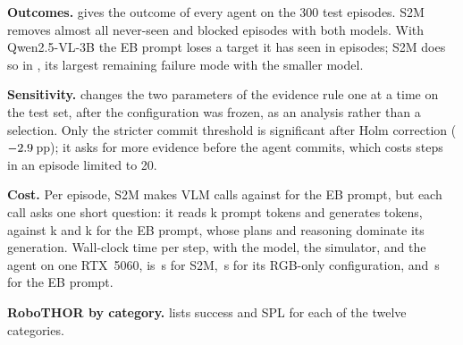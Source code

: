 \documentclass[10pt,twocolumn,letterpaper]{article}
\newcommand{\ours}{S2M\xspace}
\begin{document}
\noindent\textbf{Outcomes.}
 gives the outcome of every agent on the 300 test episodes. \ours removes almost all
never-seen and blocked episodes with both models. With Qwen2.5-VL-3B the EB prompt loses a target it has seen in
\nLostEBTwo{} episodes; \ours does so in \nLostSTwo, its largest remaining failure mode with the smaller model.

\begin{table}[t]
\centering\small
\caption{Outcomes on EB-Navigation test (episodes of 300; mean over runs where a configuration was run
repeatedly).}
\label{tab:s-taxonomy}
\footnotesize\setlength{\tabcolsep}{3pt}

\end{table}

\noindent\textbf{Sensitivity.}
 changes the two parameters of the evidence rule one at a time on the test set, after the configuration
was frozen, as an analysis rather than a selection. Only the stricter commit threshold is significant after Holm
correction ($-2.9$\,pp); it asks for more evidence before the agent commits, which costs steps in an
episode limited to 20.

\begin{table}[t]
\centering\small
\caption{Sensitivity of the evidence rule on EB-Navigation test (Qwen3-VL-4B), success rate (\%). One parameter changes
at a time; $\Delta$ (pp): paired difference from the frozen agent; $p$: sign-flip permutation test, Holm-corrected over the
four settings.}
\label{tab:s-sens}

\end{table}

\noindent\textbf{Cost.}
Per episode, \ours makes \nCallsS{} VLM calls against \nCallsEB{} for the EB prompt, but each call asks one short
question: it reads \nTokS{}k prompt tokens and generates \nTokSc{} tokens, against \nTokEB{}k and \nTokEBc{}k for the EB
prompt, whose plans and reasoning dominate its generation. Wall-clock time per step, with the model, the simulator,
and the agent on one RTX~5060, is \nSecS\,s for \ours, \nSecRGB\,s for its RGB-only configuration, and \nSecEB\,s for
the EB prompt.

\noindent\textbf{RoboTHOR by category.}
 lists success and SPL for each of the twelve categories.

\begin{table}[t]
\centering\small
\caption{\ours on RoboTHOR validation by target category.}
\label{tab:s-robothor}

\end{table}
\end{document}
